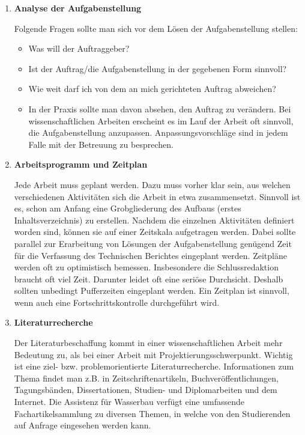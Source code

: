 \documentclass[
]{agujournal2019}
\begin{document}
\begin{enumerate}
\def\labelenumi{\arabic{enumi}.}
\item
  \textbf{Analyse der Aufgabenstellung}

  Folgende Fragen sollte man sich vor dem Lösen der Aufgabenstellung
  stellen:

  \begin{itemize}
  \item
    Was will der Auftraggeber?
  \item
    Ist der Auftrag/die Aufgabenstellung in der gegebenen Form sinnvoll?
  \item
    Wie weit darf ich von dem an mich gerichteten Auftrag abweichen?
  \item
    In der Praxis sollte man davon absehen, den Auftrag zu verändern.
    Bei wissenschaftlichen Arbeiten erscheint es im Lauf der Arbeit oft
    sinnvoll, die Aufgabenstellung anzupassen. Anpassungsvorschläge sind
    in jedem Falle mit der Betreuung zu besprechen.
  \end{itemize}
\item
  \textbf{Arbeitsprogramm und Zeitplan}

  Jede Arbeit muss geplant werden. Dazu muss vorher klar sein, aus
  welchen verschiedenen Aktivitäten sich die Arbeit in etwa
  zusammensetzt. Sinnvoll ist es, schon am Anfang eine Grobgliederung
  des Aufbaus (erstes Inhaltsverzeichnis) zu erstellen. Nachdem die
  einzelnen Aktivitäten definiert worden sind, können sie auf einer
  Zeitskala aufgetragen werden. Dabei sollte parallel zur Erarbeitung
  von Lösungen der Aufgabenstellung genügend Zeit für die Verfassung des
  Technischen Berichtes eingeplant werden. Zeitpläne werden oft zu
  optimistisch bemessen. Insbesondere die Schlussredaktion braucht oft
  viel Zeit. Darunter leidet oft eine seriöse Durchsicht. Deshalb
  sollten unbedingt Pufferzeiten eingeplant werden. Ein Zeitplan ist
  sinnvoll, wenn auch eine Fortschrittskontrolle durchgeführt wird.
\item
  \textbf{Literaturrecherche}

  Der Literaturbeschaffung kommt in einer wissenschaftlichen Arbeit mehr
  Bedeutung zu, als bei einer Arbeit mit Projektierungsschwerpunkt.
  Wichtig ist eine ziel- bzw. problemorientierte Literaturrecherche.
  Informationen zum Thema findet man z.B. in Zeitschriftenartikeln,
  Buchveröffentlichungen, Tagungsbänden, Dissertationen, Studien- und
  Diplomarbeiten und dem Internet. Die Assistenz für Wasserbau verfügt
  eine umfassende Fachartikelsammlung zu diversen Themen, in welche von
  den Studierenden auf Anfrage eingesehen werden kann.
\end{enumerate}
\end{document}
